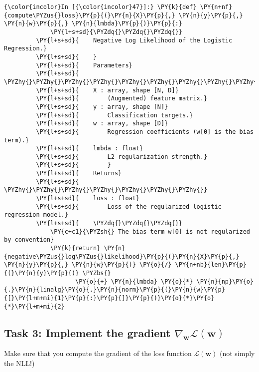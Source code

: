     \begin{Verbatim}[commandchars=\\\{\}]
{\color{incolor}In [{\color{incolor}47}]:} \PY{k}{def} \PY{n+nf}{compute\PYZus{}loss}\PY{p}{(}\PY{n}{X}\PY{p}{,} \PY{n}{y}\PY{p}{,} \PY{n}{w}\PY{p}{,} \PY{n}{lmbda}\PY{p}{)}\PY{p}{:}
             \PY{l+s+sd}{\PYZdq{}\PYZdq{}\PYZdq{}}
         \PY{l+s+sd}{    Negative Log Likelihood of the Logistic Regression.}
         \PY{l+s+sd}{    }
         \PY{l+s+sd}{    Parameters}
         \PY{l+s+sd}{    \PYZhy{}\PYZhy{}\PYZhy{}\PYZhy{}\PYZhy{}\PYZhy{}\PYZhy{}\PYZhy{}\PYZhy{}\PYZhy{}}
         \PY{l+s+sd}{    X : array, shape [N, D]}
         \PY{l+s+sd}{        (Augmented) feature matrix.}
         \PY{l+s+sd}{    y : array, shape [N]}
         \PY{l+s+sd}{        Classification targets.}
         \PY{l+s+sd}{    w : array, shape [D]}
         \PY{l+s+sd}{        Regression coefficients (w[0] is the bias term).}
         \PY{l+s+sd}{    lmbda : float}
         \PY{l+s+sd}{        L2 regularization strength.}
         \PY{l+s+sd}{        }
         \PY{l+s+sd}{    Returns}
         \PY{l+s+sd}{    \PYZhy{}\PYZhy{}\PYZhy{}\PYZhy{}\PYZhy{}\PYZhy{}\PYZhy{}}
         \PY{l+s+sd}{    loss : float}
         \PY{l+s+sd}{        Loss of the regularized logistic regression model.}
         \PY{l+s+sd}{    \PYZdq{}\PYZdq{}\PYZdq{}}
             \PY{c+c1}{\PYZsh{} The bias term w[0] is not regularized by convention}
             \PY{k}{return} \PY{n}{negative\PYZus{}log\PYZus{}likelihood}\PY{p}{(}\PY{n}{X}\PY{p}{,} \PY{n}{y}\PY{p}{,} \PY{n}{w}\PY{p}{)} \PY{o}{/} \PY{n+nb}{len}\PY{p}{(}\PY{n}{y}\PY{p}{)} \PYZbs{}
                    \PY{o}{+} \PY{n}{lmbda} \PY{o}{*} \PY{n}{np}\PY{o}{.}\PY{n}{linalg}\PY{o}{.}\PY{n}{norm}\PY{p}{(}\PY{n}{w}\PY{p}{[}\PY{l+m+mi}{1}\PY{p}{:}\PY{p}{]}\PY{p}{)}\PY{o}{*}\PY{o}{*}\PY{l+m+mi}{2}
\end{Verbatim}

    \hypertarget{task-3-implement-the-gradient-nabla_mathbfwmathcallmathbfw}{%
\subsection{\texorpdfstring{Task 3: Implement the gradient
\(\nabla_{\mathbf{w}}\mathcal{L}(\mathbf{w})\)}{Task 3: Implement the gradient \textbackslash{}nabla\_\{\textbackslash{}mathbf\{w\}\}\textbackslash{}mathcal\{L\}(\textbackslash{}mathbf\{w\})}}\label{task-3-implement-the-gradient-nabla_mathbfwmathcallmathbfw}}

    Make sure that you compute the gradient of the loss function
\(\mathcal{L}(\mathbf{w})\) (not simply the NLL!)

